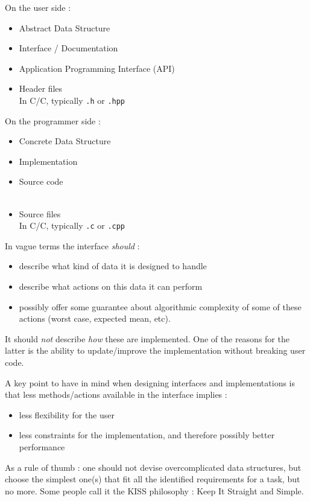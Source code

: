 \documentclass[12pt]{article}
\theoremstyle{plain}
\theoremstyle{remark}
\newcommand{\cpp}{C\nolinebreak\hspace{-.05em}\raisebox{.4ex}{\tiny\bf +}\nolinebreak\hspace{-.10em}\raisebox{.4ex}{\tiny\bf +}}
\begin{document}
\medskip

\begin{center}
	\begin{minipage}[t]{0.45\textwidth}
	On the user side :
	\begin{itemize}
		\item Abstract Data Structure
		\item Interface / Documentation
		\item Application Programming Interface (API)
		\item Header files\\
			In C/\cpp, typically {\tt .h} or {\tt .hpp}
	\end{itemize}
\end{minipage}
	\begin{minipage}[t]{0.45\textwidth}
	On the programmer side :
	\begin{itemize}
		\item Concrete Data Structure
		\item Implementation
		\item Source code\\\mbox{ }
		\item Source files\\In C/\cpp, typically {\tt .c} or {\tt .cpp}
	\end{itemize}
\end{minipage}
\end{center}

In vague terms the interface {\it should} : 
\begin{itemize}
	\item describe what kind of data it is designed to handle
	\item describe what actions on this data it can perform
	\item possibly offer some guarantee about algorithmic complexity of
		some of these actions (worst case, expected mean, etc).
\end{itemize}

It should {\it not} describe {\it how} these are implemented. One of the reasons
for the latter is the ability to update/improve the implementation without
breaking user code.

\medskip

A key point to have in mind when designing interfaces and implementations is
that less methods/actions available in the interface implies :
\begin{itemize}
	\item less flexibility for the user
	\item less constraints for the implementation, and therefore possibly
		better performance
\end{itemize}
As a rule of thumb : one should not devise overcomplicated data structures, but
choose the simplest one(s) that fit all the identified requirements for a task,
but no more. Some people call it the KISS philosophy : Keep It Straight and
Simple.
\end{document}
